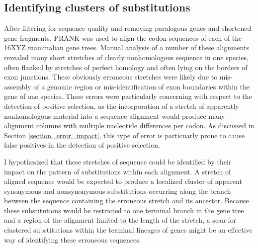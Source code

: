 \subsection{Identifying clusters of \nsyn substitutions}
\label{section_windows_clustered_subs}

After filtering for sequence quality and removing paralogous genes and
shortened gene fragments, PRANK was used to align the codon sequences
of each of the 16XYZ mammalian gene trees. Manual analysis of a number
of these alignments revealed many short stretches of clearly
nonhomologous sequence in one species, often flanked by stretches of
perfect homology and often lying on the borders of exon junctions.
These obviously erroneous stretches were likely due to mis-assembly of
a genomic region or mis-identification of exon boundaries within the
gene of one species. These errors were particularly concerning with
respect to the detection of positive selection, as the incorporation
of a stretch of apparently nonhomologous material into a sequence
alignment would produce many alignment columns with multiple
nucleotide differences per codon. As discussed in Section
\ref{section_error_impact}, this type of error is particuarly prone to
cause false positives in the detection of positive selection.

I hypothesized that these stretches of \nhom sequence could be
identified by their impact on the pattern of substitutions within each
alignment. A stretch of \nhom aligned sequence would be expected to
produce a localized cluster of apparent synonymous and nonsynonymous
substitutions occurring along the branch between the sequence
containing the erroneous stretch and its ancestor. Because these
substitutions would be restricted to one terminal branch in the gene
tree and a region of the alignment limited to the length of the \nhom
stretch, a scan for clustered substitutions within the terminal
lineages of genes might be an effective way of identifying these
erroneous sequences.

